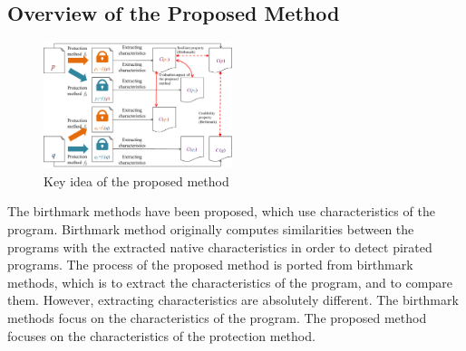 \documentclass[conference]{IEEEtran}
\begin{document}
% 
% 

\subsection{Overview of the Proposed Method}

\begin{figure}[b]
  \centering
  \includegraphics[width=0.49\textwidth]{images/key_idea}
  \caption{Key idea of the proposed method}\label{fig:keyidea}
\end{figure}

The birthmark methods have been proposed, which use characteristics of
the program\cite{tamada05ieice}.  Birthmark method originally computes
similarities between the programs with the extracted native
characteristics in order to detect pirated programs.
%
The process of the proposed method is ported from birthmark methods,
which is to extract the characteristics of the program, and to compare
them.  However, extracting characteristics are absolutely different.
The birthmark methods focus on the characteristics of the program.
The proposed method focuses on the characteristics of the protection
method.
\end{document}
